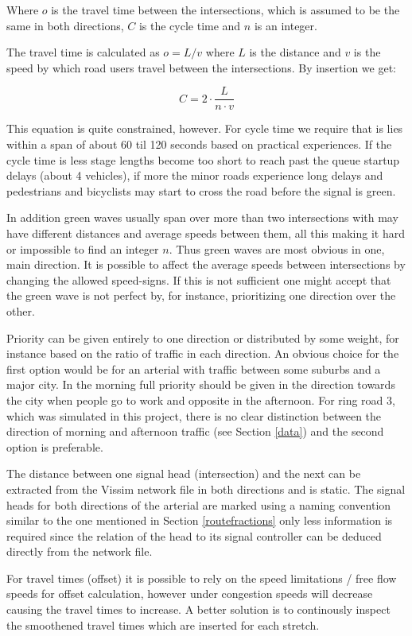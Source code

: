 Where $o$ is the travel time between the intersections, which is assumed to be the same in both directions, $C$ is the cycle time and $n$ is an integer.

The travel time is calculated as $o = L / v$ where $L$ is the distance and $v$ is the speed by which road users travel between the intersections. By insertion we get:

$$C = 2 \cdot \frac{L}{n \cdot v}$$

This equation is quite constrained, however. For cycle time we require that is lies within a span of about 60 til 120 seconds based on practical experiences. If the cycle time is less stage lengths become too short to reach past the queue startup delays (about 4 vehicles), if more the minor roads experience long delays and pedestrians and bicyclists may start to cross the road before the signal is green.

In addition green waves usually span over more than two intersections with may have different distances and average speeds between them, all this making it hard or impossible to find an integer $n$. Thus green waves are most obvious in one, main direction. It is possible to affect the average speeds between intersections by changing the allowed speed-signs. If this is not sufficient one might accept that the green wave is not perfect by, for instance, prioritizing one direction over the other.

Priority can be given entirely to one direction or distributed by some weight, for instance based on the ratio of traffic in each direction. An obvious choice for the first option would be for an arterial with traffic between some suburbs and a major city. In the morning full priority should be given in the direction towards the city when people go to work and opposite in the afternoon. For ring road 3, which was simulated in this project, there is no clear distinction between the direction of morning and afternoon traffic (see Section \ref{data}) and the second option is preferable.

The distance between one signal head (intersection) and the next can be extracted from the Vissim network file in both directions and is static. The signal heads for both directions of the arterial are marked using a naming convention similar to the one mentioned in Section \ref{routefractions} only less information is required since the relation of the head to its signal controller can be deduced directly from the network file.

For travel times (offset) it is possible to rely on the speed limitations / free flow speeds for offset calculation, however under congestion speeds will decrease causing the travel times to increase. A better solution is to continously inspect the smoothened travel times which are inserted for each stretch. 

